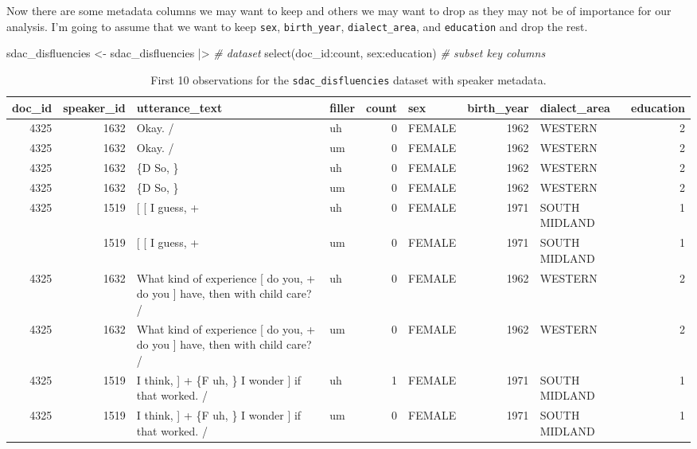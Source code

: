 \documentclass[
  letterpaper,
]{latex/krantz}
\newenvironment{Shaded}{\begin{snugshade}}{\end{snugshade}}
\newcommand{\CommentTok}[1]{\textcolor[rgb]{0.00,0.00,0.00}{\textit{#1}}}
\newcommand{\FunctionTok}[1]{\textcolor[rgb]{0.00,0.00,0.00}{#1}}
\newcommand{\NormalTok}[1]{\textcolor[rgb]{0.00,0.00,0.00}{#1}}
\newcommand{\OtherTok}[1]{\textcolor[rgb]{0.00,0.00,0.00}{#1}}
\newcommand{\SpecialCharTok}[1]{\textcolor[rgb]{0.00,0.00,0.00}{#1}}
\begin{document}
Now there are some metadata columns we may want to keep and others we
may want to drop as they may not be of importance for our analysis. I'm
going to assume that we want to keep \texttt{sex}, \texttt{birth\_year},
\texttt{dialect\_area}, and \texttt{education} and drop the rest.

\begin{Shaded}
\begin{Highlighting}[]
\NormalTok{sdac\_disfluencies }\OtherTok{\textless{}{-}} 
\NormalTok{  sdac\_disfluencies }\SpecialCharTok{|\textgreater{}} \CommentTok{\# dataset}
  \FunctionTok{select}\NormalTok{(doc\_id}\SpecialCharTok{:}\NormalTok{count, sex}\SpecialCharTok{:}\NormalTok{education) }\CommentTok{\# subset key columns}
\end{Highlighting}
\end{Shaded}

\hypertarget{tbl-td-sdac-disfluencies-meta-preview}{}
\begin{table}
\caption{\label{tbl-td-sdac-disfluencies-meta-preview}First 10 observations for the \texttt{sdac\_disfluencies} dataset with
speaker metadata. }\tabularnewline

\centering
\begin{tabular}{rrllrlrlr}
\toprule
doc\_id & speaker\_id & utterance\_text & filler & count & sex & birth\_year & dialect\_area & education\\
\midrule
4325 & 1632 & Okay.  / & uh & 0 & FEMALE & 1962 & WESTERN & 2\\
4325 & 1632 & Okay.  / & um & 0 & FEMALE & 1962 & WESTERN & 2\\
4325 & 1632 & \{D So, \} & uh & 0 & FEMALE & 1962 & WESTERN & 2\\
4325 & 1632 & \{D So, \} & um & 0 & FEMALE & 1962 & WESTERN & 2\\
4325 & 1519 & {}[ [ I guess, + & uh & 0 & FEMALE & 1971 & SOUTH MIDLAND & 1\\
\addlinespace
4325 & 1519 & {}[ [ I guess, + & um & 0 & FEMALE & 1971 & SOUTH MIDLAND & 1\\
4325 & 1632 & What kind of experience [ do you, + do you ] have, then with child care? / & uh & 0 & FEMALE & 1962 & WESTERN & 2\\
4325 & 1632 & What kind of experience [ do you, + do you ] have, then with child care? / & um & 0 & FEMALE & 1962 & WESTERN & 2\\
4325 & 1519 & I think, ] + \{F uh, \} I wonder ] if that worked. / & uh & 1 & FEMALE & 1971 & SOUTH MIDLAND & 1\\
4325 & 1519 & I think, ] + \{F uh, \} I wonder ] if that worked. / & um & 0 & FEMALE & 1971 & SOUTH MIDLAND & 1\\
\bottomrule
\end{tabular}
\end{table}
\end{document}
